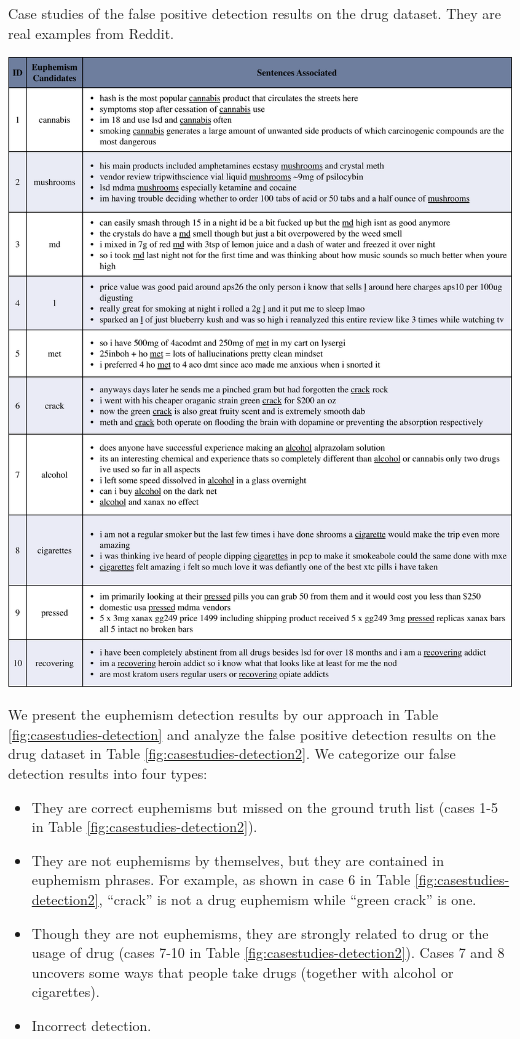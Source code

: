 \begin{table}
	\centering
	\caption{Case studies of the false positive detection results on the drug dataset. They are real examples from Reddit.}
	\includegraphics[width=1\linewidth]{figures/CaseStudies-Detection2}
	\label{fig:casestudies-detection2}
\end{table}

We present the euphemism detection results by our approach in Table \ref{fig:casestudies-detection} and analyze the false positive detection results on the drug dataset in Table \ref{fig:casestudies-detection2}. 
We categorize our false detection results into four types: 
\begin{itemize}
	\item They are correct euphemisms but missed on the ground truth list (cases 1-5 in Table \ref{fig:casestudies-detection2}). 
	\item They are not euphemisms by themselves, but they are contained in euphemism phrases. For example, as shown in case 6 in Table \ref{fig:casestudies-detection2}, ``crack'' is not a drug euphemism while ``green crack'' is one. 
	\item Though they are not euphemisms, they are strongly related to drug or the usage of drug (cases 7-10 in Table \ref{fig:casestudies-detection2}). Cases 7 and 8 uncovers some ways that people take drugs (together with alcohol or cigarettes).
	\item Incorrect detection. 
\end{itemize}

